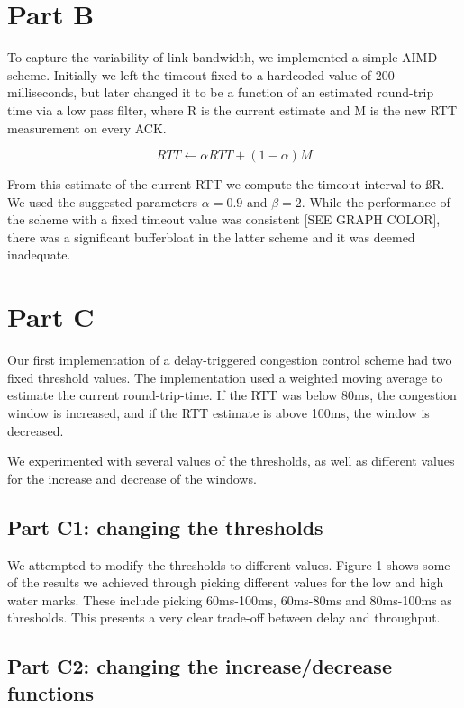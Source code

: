 \documentclass[12pt]{article}
\begin{document}
\section*{Part B}


To capture the variability of link bandwidth, we implemented a simple AIMD
scheme.  Initially we left the timeout fixed to a hardcoded value of 200
milliseconds, but later changed it to be a function of an estimated round-trip
time via a low pass filter, where R is the current estimate and M is the new RTT
measurement on every ACK. \cite{jacobson}

$${RTT} \leftarrow \alpha {RTT} + \left(1 - \alpha\right)M$$

From this estimate of the current RTT we compute the timeout interval to ßR. We
used the suggested parameters $\alpha = 0.9$ and $\beta = 2$. While the
performance of the scheme with a fixed timeout value was consistent [SEE GRAPH
COLOR], there was a significant bufferbloat in the  latter scheme and it was
deemed inadequate.

\section*{Part C}

Our first implementation of a delay-triggered congestion control scheme had two
fixed threshold values. The implementation used a weighted moving average to
estimate the current round-trip-time. If the RTT was below 80ms, the congestion
window is increased, and if the RTT estimate is above 100ms, the window is
decreased.

We experimented with several values of the thresholds, as well as different
values for the increase and decrease of the windows.

\subsection*{Part C1: changing the thresholds}

We attempted to modify the thresholds to different values. Figure 1 shows some
of the results we achieved through picking different values for the low and high
water marks. These include picking 60ms-100ms, 60ms-80ms and 80ms-100ms as
thresholds. This presents a very clear trade-off between delay and throughput.

\subsection*{Part C2: changing the increase/decrease functions}
\end{document}
